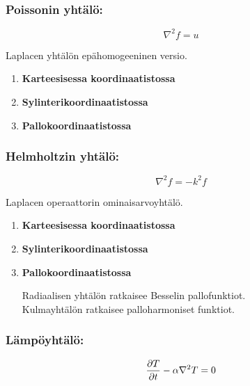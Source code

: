 \documentclass[../johdoksia.tex]{subfiles}
\begin{document}
	\subsubsection{Poissonin yhtälö:}
	
	\begin{equation}
		\nabla^2f = u 
	\end{equation}

	Laplacen yhtälön epähomogeeninen versio.
	
	\begin{enumerate}
		\item \textbf{Karteesisessa koordinaatistossa}
		
		\item \textbf{Sylinterikoordinaatistossa}
		
		\item \textbf{Pallokoordinaatistossa}
	\end{enumerate}
	
	\subsubsection{Helmholtzin yhtälö:}
	
	\begin{equation}
		\nabla^2f = -k^2f
	\end{equation}

	Laplacen operaattorin ominaisarvoyhtälö.

	\begin{enumerate}
		\item \textbf{Karteesisessa koordinaatistossa}
		
		\item \textbf{Sylinterikoordinaatistossa}
		
		\item \textbf{Pallokoordinaatistossa}
		
		Radiaalisen yhtälön ratkaisee Besselin pallofunktiot. \\
		
		Kulmayhtälön ratkaisee palloharmoniset funktiot.
	\end{enumerate}


	
	\subsubsection{Lämpöyhtälö:}
	
	\begin{equation}
		\pdv{T}{t} - \alpha\nabla^2T = 0
	\end{equation}
\end{document}
